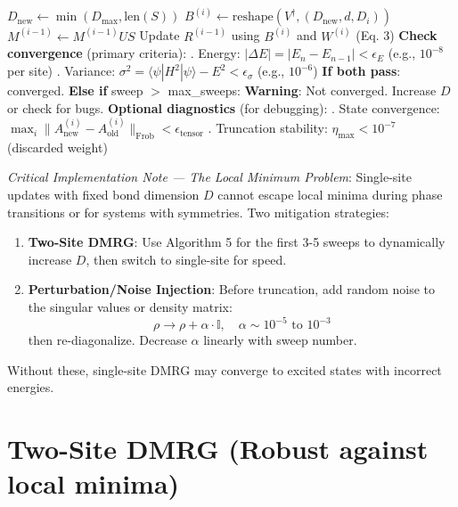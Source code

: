 \documentclass[aps,prb,onecolumn,scriptaddress]{revtex4-2}
\newcommand{\ket}[1]{|#1\rangle}
\newcommand{\bra}[1]{\langle#1|}
\newcommand{\eps}{\epsilon}
\begin{document}
\begin{algorithm}[H]
\begin{algorithmic}[1]
			\State $D_{\text{new}} \gets \min(D_{\max}, \text{len}(S))$
			\State $B^{(i)} \gets \text{reshape}(V^\dagger, (D_{\text{new}}, d, D_i))$
			\State $M^{(i-1)} \gets M^{(i-1)}US$ 
			\State Update $R^{(i-1)}$ using $B^{(i)}$ and $W^{(i)}$ (Eq. 3)
			\EndFor
			\State \textbf{Check convergence} (primary criteria):
			\State {}. Energy: $|\Delta E| = |E_n - E_{n-1}| < \eps_E$ (e.g., $10^{-8}$ per site)
			\State {}. Variance: $\sigma^2 = \bra{\psi}H^2\ket{\psi} - E^2 < \eps_{\sigma}$ (e.g., $10^{-6}$)
			\State \textbf{If both pass}: converged. \textbf{Else if} sweep $>$ max\_sweeps: 
			\State \quad \textbf{Warning}: Not converged. Increase $D$ or check for bugs.
			\State \textbf{Optional diagnostics} (for debugging):
			\State {}. State convergence: $\max_i \|A^{(i)}_{\text{new}} - A^{(i)}_{\text{old}}\|_{\text{Frob}} < \eps_{\text{tensor}}$
			\State {}. Truncation stability: $\eta_{\text{max}} < 10^{-7}$ (discarded weight)
			\EndWhile
		\end{algorithmic}
	\end{algorithm}
	
	\textit{Critical Implementation Note — The Local Minimum Problem}:
	Single-site updates with fixed bond dimension $D$ cannot escape local minima during phase transitions or for systems with symmetries. Two mitigation strategies:
	\begin{enumerate}
		\item \textbf{Two-Site DMRG}: Use Algorithm 5 for the first 3-5 sweeps to dynamically increase $D$, then switch to single-site for speed.
		\item \textbf{Perturbation/Noise Injection}: Before truncation, add random noise to the singular values or density matrix:
		\begin{equation}
			\rho \to \rho + \alpha \cdot \mathbb{I}, \quad \alpha \sim 10^{-5} \text{ to } 10^{-3}
		\end{equation}
		then re-diagonalize. Decrease $\alpha$ linearly with sweep number.
	\end{enumerate}
	Without these, single-site DMRG may converge to excited states with incorrect energies.
	
	\section{Two-Site DMRG (Robust against local minima)}
	
\end{document}
